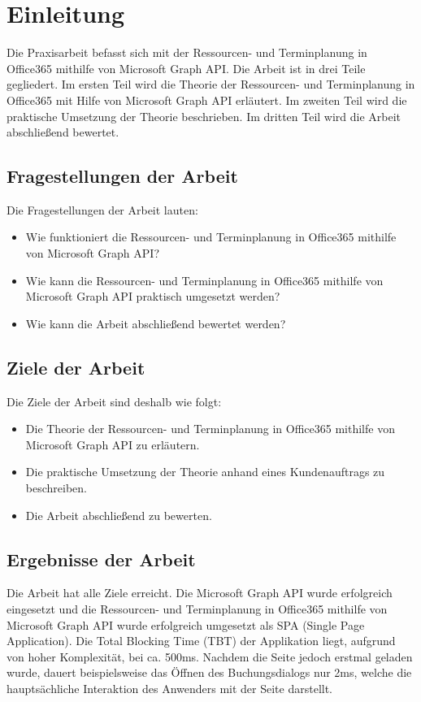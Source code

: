 


\section{Einleitung}\label{sec:einleitung}
Die Praxisarbeit befasst sich mit der Ressourcen- und Terminplanung in Office365 mithilfe von Microsoft Graph API. Die Arbeit ist in drei Teile gegliedert.
Im ersten Teil wird die Theorie der Ressourcen- und Terminplanung in Office365 mit Hilfe von Microsoft Graph API erläutert.
Im zweiten Teil wird die praktische Umsetzung der Theorie beschrieben. Im dritten Teil wird die Arbeit abschließend bewertet.
    \newline
    \subsection{Fragestellungen der Arbeit}\label{subsec:fragestellungen-der-arbeit}
Die Fragestellungen der Arbeit lauten:
    \begin{itemize}
        \item Wie funktioniert die Ressourcen- und Terminplanung in Office365 mithilfe von Microsoft Graph API?
        \item Wie kann die Ressourcen- und Terminplanung in Office365 mithilfe von Microsoft Graph API praktisch umgesetzt werden?
        \item Wie kann die Arbeit abschließend bewertet werden?
    \end{itemize}
    \subsection{Ziele der Arbeit}\label{subsec:ziele-der-arbeit}
Die Ziele der Arbeit sind deshalb wie folgt:
    \begin{itemize}
        \item Die Theorie der Ressourcen- und Terminplanung in Office365 mithilfe von Microsoft Graph API zu erläutern.
        \item Die praktische Umsetzung der Theorie anhand eines Kundenauftrags zu beschreiben.
        \item Die Arbeit abschließend zu bewerten.
    \end{itemize}
    \subsection{Ergebnisse der Arbeit}\label{subsec:ergebnisse-der-arbeit}
Die Arbeit hat alle Ziele erreicht.
    Die Microsoft Graph API wurde erfolgreich eingesetzt und die Ressourcen- und Terminplanung in Office365 mithilfe von Microsoft Graph API wurde erfolgreich umgesetzt als SPA (Single Page Application).
    Die Total Blocking Time (TBT) der Applikation liegt, aufgrund von hoher Komplexität, bei ca. 500ms.
    Nachdem die Seite jedoch erstmal geladen wurde, dauert beispielsweise das Öffnen des Buchungsdialogs nur 2ms, welche die hauptsächliche Interaktion des Anwenders mit der Seite darstellt.
    \newline
\newpage

